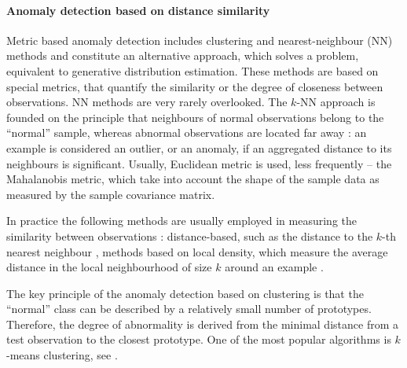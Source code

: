 \documentclass[a4paper,14pt]{extarticle}
\begin{document}

\paragraph{Anomaly detection based on distance similarity} %
\label{par:anomaly_detection_based_on_distance_similarity}

Metric based anomaly detection includes clustering and nearest-neighbour (NN) methods
and constitute an alternative approach, which solves a problem, equivalent to generative
distribution estimation. These methods are based on special metrics, that quantify
the similarity or the degree of closeness between observations. NN methods are very
rarely overlooked. The $k$-NN approach is founded on the principle that neighbours
of normal observations belong to the ``normal'' sample, whereas abnormal observations
are located far away \cite{hautamaki2004}: an example is considered an outlier, or
an anomaly, if an aggregated distance to its neighbours is significant. Usually,
Euclidean metric is used, less frequently -- the Mahalanobis metric, which take
into account the shape of the sample data as measured by the sample covariance matrix.

In practice the following methods are usually employed in measuring the similarity
between observations \cite{duda2012}: distance-based, such as the distance to the
$k$-th nearest neighbour \cite{zhang2006}, methods based on local density, which
measure the average distance in the local neighbourhood of size $k$ around an example
\cite{hautamaki2004}.

The key principle of the anomaly detection based on clustering is that the ``normal''
class can be described by a relatively small number of prototypes. Therefore, the
degree of abnormality is derived from the minimal distance from a test observation
to the closest prototype.  One of the most popular algorithms is $k$-means clustering,
see \cite{srivastava2005,srivastava2006}.
\end{document}
